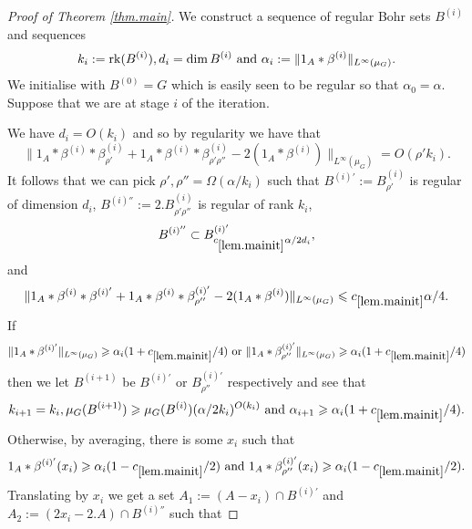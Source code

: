 \documentclass[12pt]{amsart}  %
\begin{document}
\begin{proof}[Proof of Theorem \ref{thm.main}]
We construct a sequence of regular Bohr sets $B^{(i)}$ and sequences
\begin{equation*}
k_i:=\rk(B^{(i)}),d_i=\dim B^{(i)} \textrm{ and } \alpha_i:=\|1_A \ast \beta^{(i)}\|_{L^\infty(\mu_G)}.
\end{equation*}
We initialise with $B^{(0)}=G$ which is easily seen to be regular so that $\alpha_0=\alpha$.  Suppose that we are at stage $i$ of the iteration.  

We have $d_i=O(k_i)$ and so by regularity we have that
\begin{equation*}
\|1_A \ast \beta^{(i)} \ast \beta^{(i)}_{\rho'} +1_{A} \ast \beta^{(i)}\ast \beta^{(i)}_{\rho'\rho''} - 2(1_A \ast \beta^{(i)})\|_{L^\infty(\mu_G)} = O(\rho'k_i).
\end{equation*}
It follows that we can pick $\rho',\rho'' = \Omega(\alpha/k_i)$ such that $B^{(i)'}:=B_{\rho'}^{(i)}$ is regular of dimension $d_i$, $B^{(i)''}:=2.B_{\rho'\rho''}^{(i)}$ is regular of rank $k_i$,
\begin{equation*}
B^{(i)''} \subset B^{(i)'}_{c_{\ref{lem.mainit}}\alpha/2d_i},
\end{equation*}
and
\begin{equation*}
\|1_A \ast \beta^{(i)} \ast \beta^{(i)'} +1_{A} \ast \beta^{(i)}\ast \beta^{(i)'}_{\rho''} - 2(1_A \ast \beta^{(i)})\|_{L^\infty(\mu_G)} \leq c_{\ref{lem.mainit}}\alpha/4.
\end{equation*}
If
\begin{equation*}
\|1_A \ast \beta^{(i)'}\|_{L^\infty(\mu_G)} \geq \alpha_i(1+c_{\ref{lem.mainit}}/4) \textrm{ or } \|1_A \ast \beta^{(i)'}_{\rho''}\|_{L^\infty(\mu_G)} \geq \alpha_i(1+c_{\ref{lem.mainit}}/4)
\end{equation*}
then we let $B^{(i+1)}$ be $B^{(i)'}$ or $B^{(i)'}_{\rho''}$ respectively and see that
\begin{equation*}
k_{i+1} =k_i, \mu_G(B^{(i+1)}) \geq \mu_G(B^{(i)})(\alpha/2k_i)^{O(k_i)} \textrm{ and } \alpha_{i+1} \geq \alpha_i(1+c_{\ref{lem.mainit}}/4).
\end{equation*}
Otherwise, by averaging, there is some $x_i$ such that
\begin{equation*}
1_A \ast \beta^{(i)'}(x_i) \geq \alpha_i(1-c_{\ref{lem.mainit}}/2) \textrm{ and } 1_A \ast \beta^{(i)'}_{\rho''}(x_i) \geq \alpha_i(1-c_{\ref{lem.mainit}}/2).
\end{equation*}
Translating by $x_i$ we get a set $A_1:=(A-x_i) \cap B^{(i)'}$ and $A_2:=(2x_i-2.A)\cap B^{(i)''}$ such that

\end{proof}
\end{document}
